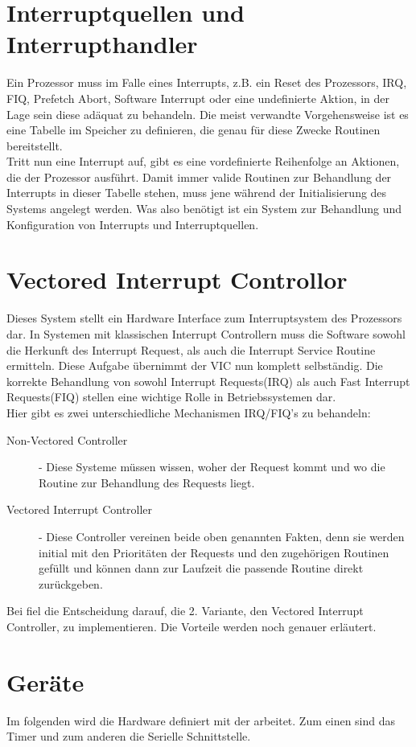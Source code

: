 \section{Interruptquellen und Interrupthandler}
Ein Prozessor muss im Falle eines Interrupts, z.B. ein Reset des Prozessors, IRQ, FIQ, Prefetch Abort, Software Interrupt oder eine undefinierte Aktion, in der Lage sein diese ad\"aquat zu behandeln. Die meist verwandte Vorgehensweise ist es eine Tabelle im Speicher zu definieren, die genau f\"ur diese Zwecke Routinen bereitstellt\parencite[53]{archManI}.\\ Tritt nun eine Interrupt auf, gibt es eine vordefinierte Reihenfolge an Aktionen, die der Prozessor ausf\"uhrt. Damit immer valide Routinen zur Behandlung der Interrupts in dieser Tabelle stehen, muss jene w\"ahrend der Initialisierung des Systems angelegt werden. Was \mops also ben\"otigt ist ein System zur Behandlung und Konfiguration von Interrupts und Interruptquellen.
\section{Vectored Interrupt Controllor}
Dieses System stellt ein Hardware Interface zum Interruptsystem des Prozessors dar. In Systemen mit klassischen Interrupt Controllern muss die Software sowohl die Herkunft des Interrupt Request, als auch die Interrupt Service Routine ermitteln. Diese Aufgabe \"ubernimmt der VIC nun komplett selbst\"andig.
Die korrekte Behandlung von sowohl Interrupt Requests(IRQ) als auch Fast Interrupt Requests(FIQ) stellen eine wichtige Rolle in Betriebssystemen dar.\\
Hier gibt es zwei unterschiedliche Mechanismen IRQ/FIQ's zu behandeln:

\begin{description}
	\item[Non-Vectored Controller] - Diese Systeme m\"ussen wissen, woher der Request kommt und wo die Routine zur Behandlung des Requests liegt.
	\item[Vectored Interrupt Controller] - Diese Controller vereinen beide oben genannten Fakten, denn sie werden initial mit den Priorit\"aten der Requests und den zugeh\"origen Routinen gef\"ullt und k\"onnen dann zur Laufzeit die passende Routine direkt zur\"uckgeben.
\end{description}
Bei \mops fiel die Entscheidung darauf, die 2. Variante, den Vectored Interrupt Controller, zu implementieren. Die Vorteile werden noch genauer erl\"autert.
\section{Ger\"ate}
Im folgenden wird die Hardware definiert mit der \mops arbeitet. Zum einen sind das Timer und zum anderen die Serielle Schnittstelle.
